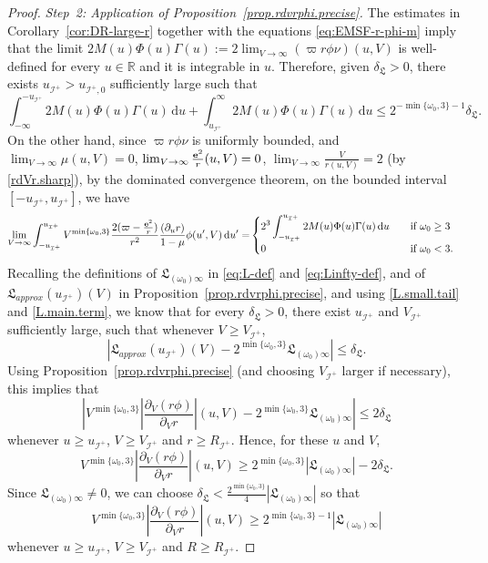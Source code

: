 \documentclass[10pt, reqno]{amsart}
\theoremstyle{definition}
\theoremstyle{remark}
\theoremstyle{conjecture}
\numberwithin{equation}{section}
\newcommand{\ud}{\mathrm{d}}
\newcommand{\rd}{\partial}
\newcommand{\0}{\emptyset}
\newcommand{\omg}{\omega}
\newcommand{\bfe}{{\bf e}}
\newcommand{\calI}{\mathcal I}
\newcommand{\f}{\frac}
\newcommand{\de}{\delta}
\newcommand{\pfstep}[1]{\vspace{.5em} {\it \noindent #1.}}
\newcommand{\e}{\bfe}							%
\newcommand{\NI}{\calI^{+}}						%
\begin{document}
\begin{proof}
\pfstep{Step~2: Application of Proposition~\ref{prop.rdvrphi.precise}} The estimates in Corollary~\ref{cor:DR-large-r} together with the equations \eqref{eq:EMSF-r-phi-m} imply that the limit $2M(u)\Phi(u)\Gamma(u):=2\lim_{V\to \infty} (\varpi r\phi\nu)(u,V)$ is well-defined for every $u\in \mathbb R$ and it is integrable in $u$. Therefore, given $\de_{\mathfrak L}>0$, there exists $u_{\calI^+}>u_{\calI^+,0}$ sufficiently large such that 
\begin{equation}\label{L.small.tail}
\int_{-\infty}^{-u_{\calI^+}} 2M(u)\Phi(u)\Gamma(u)\, \ud u + \int^{\infty}_{u_{\calI^+}} 2M(u)\Phi(u)\Gamma(u)\, \ud u\leq 2^{-\min\{\omg_0,3\}-1} \de_{\mathfrak L}.
\end{equation}
On the other hand, since $\varpi r\phi\nu$ is uniformly bounded, and $\lim_{V\to \infty}\mu(u,V)=0$, $\lim_{V\to \infty}\f{\e^2}{r}(u,V)=0$, $\lim_{V\to\infty} \f{V}{r(u,V)}=2$ (by \eqref{rdVr.sharp}), by the dominated convergence theorem, on the bounded interval $[-u_{\calI^+}, u_{\calI^+}]$, we have
\begin{equation}\label{L.main.term}
\begin{split}
\lim_{V\to \infty} \int_{-u_{\calI^+}}^{u_{\calI^+}}  V^{\min\{\omg_0,3\}}\frac{2(\varpi - \frac{\e^{2}}{r})}{r^{2}} \frac{(\rd_{u} r)}{1-\mu}\phi(u',V) \, \ud u'
=&\begin{cases}\displaystyle 2^{3}\int_{-u_{\calI^+}}^{u_{\calI^+}} 2 M(u)\Phi(u)\Gamma(u)\, \ud u &\quad \mbox{if }\omg_0\geq 3\\
\displaystyle 0&\quad \mbox{if }\omg_0< 3.
\end{cases}
\end{split}
\end{equation}
Recalling the definitions of $\mathfrak L_{(\omg_0)\infty}$ in \eqref{eq:L-def} and \eqref{eq:Linfty-def}, and of $\mathfrak L_{approx}(u_{\calI^+})(V)$ in Proposition~\ref{prop.rdvrphi.precise}, and using \eqref{L.small.tail} and \eqref{L.main.term}, we know that for every $\de_{\mathfrak L}>0$, there exist $u_{\calI^+}$ and $V_{\calI^+}$ sufficiently large, such that whenever $V\geq V_{\calI^+}$,  
$$\left| \mathfrak L_{approx}(u_{\calI^+})(V)-2^{\min\{\omg_0,3\}}\mathfrak L_{(\omg_0)\infty}\right|\leq \de_{\mathfrak L}.$$
Using Proposition~\ref{prop.rdvrphi.precise} (and choosing $V_{\calI^+}$ larger if necessary), this implies that 
$$\left|V^{\min\{\omg_0,3\}}\left|\f{\rd_V(r\phi)}{\rd_V r}\right|(u,V)-2^{\min\{\omg_0,3\}}\mathfrak L_{(\omg_0)\infty}\right|\leq 2\de_{\mathfrak L}$$
whenever $u\geq u_{\calI^+}$, $V\geq V_{\calI^+}$ and $r\geq R_{\NI}$. Hence, for these $u$ and $V$,
$$V^{\min\{\omg_0,3\}}\left|\f{\rd_V(r\phi)}{\rd_V r}\right|(u,V)\geq 2^{\min\{\omg_0,3\}} \left|\mathfrak L_{(\omg_0)\infty}\right|-2\de_{
\mathfrak L}.$$
Since $\mathfrak L_{(\omg_0)\infty}\neq 0$, we can choose $\de_{\mathfrak L}<\f{2^{\min\{\omg_0,3\}}}{4} \left|\mathfrak L_{(\omg_0)\infty}\right|$ so that
$$V^{\min\{\omg_0,3\}}\left|\f{\rd_V(r\phi)}{\rd_V r}\right|(u,V)\geq 2^{\min\{\omg_0,3\}-1} \left|\mathfrak L_{(\omg_0)\infty}\right|$$
whenever $u\geq u_{\calI^+}$, $V\geq V_{\calI^+}$ and $R\geq R_{\calI^+}$.


\end{proof}
\end{document}
